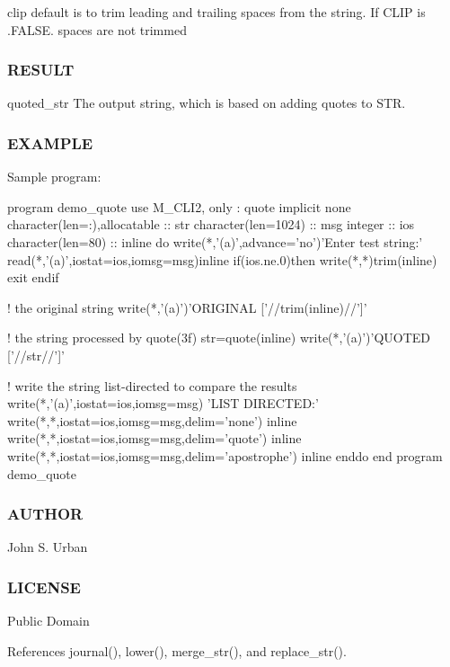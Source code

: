 clip default is to trim leading and trailing spaces from the string. If C\+L\+IP is .F\+A\+L\+SE. spaces are not trimmed

\subsubsection*{R\+E\+S\+U\+LT}

quoted\+\_\+str The output string, which is based on adding quotes to S\+TR. \subsubsection*{E\+X\+A\+M\+P\+LE}

Sample program\+: \begin{DoxyVerb}program demo_quote
use M_CLI2, only : quote
implicit none
character(len=:),allocatable :: str
character(len=1024)          :: msg
integer                      :: ios
character(len=80)            :: inline
   do
      write(*,'(a)',advance='no')'Enter test string:'
      read(*,'(a)',iostat=ios,iomsg=msg)inline
      if(ios.ne.0)then
         write(*,*)trim(inline)
         exit
      endif

      ! the original string
      write(*,'(a)')'ORIGINAL     ['//trim(inline)//']'

      ! the string processed by quote(3f)
      str=quote(inline)
      write(*,'(a)')'QUOTED     ['//str//']'

      ! write the string list-directed to compare the results
      write(*,'(a)',iostat=ios,iomsg=msg) 'LIST DIRECTED:'
      write(*,*,iostat=ios,iomsg=msg,delim='none') inline
      write(*,*,iostat=ios,iomsg=msg,delim='quote') inline
      write(*,*,iostat=ios,iomsg=msg,delim='apostrophe') inline
   enddo
end program demo_quote
\end{DoxyVerb}


\subsubsection*{A\+U\+T\+H\+OR}

John S. Urban \subsubsection*{L\+I\+C\+E\+N\+SE}

Public Domain 

References journal(), lower(), merge\+\_\+str(), and replace\+\_\+str().

